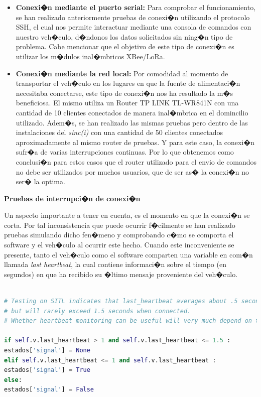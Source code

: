 \begin{itemize}
	
	\item \textbf{Conexi�n mediante el puerto serial: } Para comprobar el funcionamiento, se han realizado anteriormente pruebas de conexi�n utilizando el protocolo SSH, el cual nos permite interactuar mediante una consola de comandos con nuestro veh�culo, d�ndonos los datos solicitados sin ning�n tipo de problema. Cabe mencionar que el objetivo de este tipo de conexi�n es utilizar los m�dulos inal�mbricos XBee/LoRa. 
	
	\item \textbf{Conexi�n mediante la red local: } Por comodidad al momento de transportar el veh�culo en los lugares en que la fuente de alimentaci�n necesitaba conectarse, este tipo de conexi�n nos ha resultado la m�s beneficiosa. El mismo utiliza un Router TP LINK TL-WR841N con una cantidad de 10 clientes conectados de manera inal�mbrica en el domincilio utilizado. Adem�s, se han realizado las mismas pruebas pero dentro de las instalaciones del \textit{sinc(i)} con una cantidad de 50 clientes  conectados aproximadamente al mismo router de pruebas. Y para este caso, la conexi�n sufr�a de varias interrupciones continuas.  Por lo que obtenemos como conclusi�n para estos casos que el router utilizado para el envio de comandos no debe ser utilizados por muchos usuarios, que de ser as� la conexi�n no ser� la optima.
\end{itemize}

\textbf{Pruebas de interrupci�n de conexi�n}

Un aspecto importante a tener en cuenta, es el momento en que la conexi�n se corta. Por tal inconsistencia que puede ocurrir f�cilmente  se han realizado pruebas simulando dicho fen�meno y comprobando c�mo se comporta el software y el veh�culo al ocurrir este hecho. 
Cuando este inconveniente se presente, tanto el veh�culo como el software comparten una variable en com�n llamada \textit{last heartbeat}, la cual contiene informaci�n sobre el tiempo (en segundos) en que ha recibido su �ltimo mensaje proveniente del veh�culo.

\begin{lstlisting}[language=python]

# Testing on SITL indicates that last_heartbeat averages about .5 seconds,
# but will rarely exceed 1.5 seconds when connected. 
# Whether heartbeat monitoring can be useful will very much depend on the application.

if self.v.last_heartbeat > 1 and self.v.last_heartbeat <= 1.5 :
estados['signal'] = None
elif self.v.last_heartbeat <= 1 and self.v.last_heartbeat :
estados['signal'] = True
else:
estados['signal'] = False	
\end{lstlisting}



